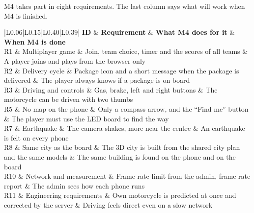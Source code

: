 \documentclass[
  english,
  10pt,
  a4paper,
]{article}
\newcommand{\ckkeep}[1]{\par\noindent\begin{minipage}{\linewidth}\setlength{\parskip}{4pt}#1\end{minipage}\par\smallskip}
\begin{document}
\ckkeep{%
M4 takes part in eight requirements. The last column says what will work when M4 is finished.

\begin{tabular}{|L{0.06}|L{0.15}|L{0.40}|L{0.39}|}
\hline \textbf{ID} & \textbf{Requirement} & \textbf{What M4 does for it} & \textbf{When M4 is done} \\ \hline 
R1 & Multiplayer game & Join, team choice, timer and the scores of all teams & A player joins and plays from the browser only \\ \hline
R2 & Delivery cycle & Package icon and a short message when the package is delivered & The player always knows if a package is on board \\ \hline
R3 & Driving and controls & Gas, brake, left and right buttons & The motorcycle can be driven with two thumbs \\ \hline
R5 & No map on the phone & Only a compass arrow, and the ``Find me'' button & The player must use the LED board to find the way \\ \hline
R7 & Earthquake & The camera shakes, more near the centre & An earthquake is felt on every phone \\ \hline
R8 & Same city as the board & The 3D city is built from the shared city plan and the same models & The same building is found on the phone and on the board \\ \hline
R10 & Network and measurement & Frame rate limit from the admin, frame rate report & The admin sees how each phone runs \\ \hline
R11 & Engineering requirements & Own motorcycle is predicted at once and corrected by the server & Driving feels direct even on a slow network \\ \hline
\end{tabular}}

\end{document}
